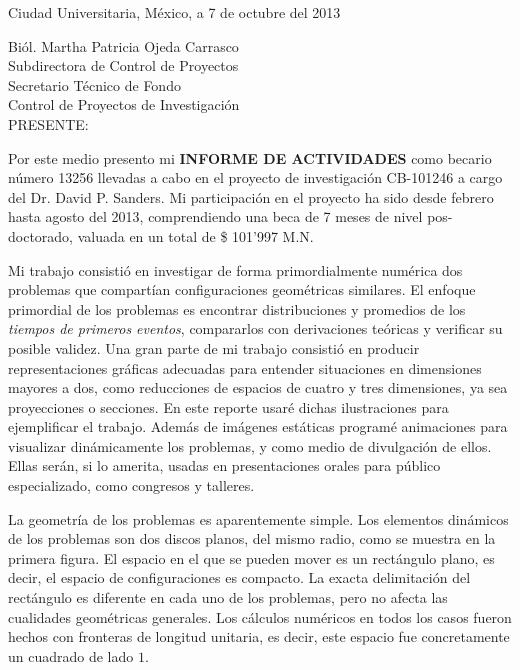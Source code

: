 \documentclass[letterpaper, 11pt]{article}
\author{Wilhelm Pablo Karel Zapfe Zaldivar}
\begin{document}
\begin{flushright}
Ciudad Universitaria, México, a 7 de octubre del 2013
\end{flushright}
 
\vspace{4cm}

\noindent Biól. Martha Patricia Ojeda Carrasco
 \\ Subdirectora de Control de Proyectos
\\ Secretario Técnico de Fondo \\ 
Control de Proyectos de Investigación\\
PRESENTE:

\vspace{2cm}

Por este medio presento mi \textbf{INFORME DE ACTIVIDADES} como becario 
número 13256 llevadas a cabo en el proyecto de investigación
CB-101246 a cargo del Dr. David P. Sanders. Mi participación en el proyecto
ha sido desde febrero hasta agosto del 2013, 
comprendiendo una beca
de 7 meses de nivel pos-doctorado, valuada en un total de \$ 101'997 M.N.

Mi trabajo consistió en investigar de forma primordialmente
numérica dos problemas
que compartían configuraciones geométricas similares.
El enfoque primordial de los problemas es encontrar distribuciones y
promedios de los \emph{tiempos de primeros eventos},  
compararlos con derivaciones
teóricas y verificar su posible validez. Una gran parte de mi trabajo
consistió en producir representaciones gráficas adecuadas para
entender situaciones en dimensiones mayores a dos, como
reducciones de espacios de cuatro y tres dimensiones, ya
sea proyecciones o secciones. En este reporte 
usaré dichas ilustraciones para ejemplificar el
trabajo. Además de imágenes estáticas programé 
animaciones para visualizar dinámicamente los problemas, y como
medio de divulgación de ellos. Ellas serán, si lo amerita, usadas
en presentaciones orales 
para público especializado, como congresos y talleres.

La geometría de los problemas es aparentemente simple.
Los elementos dinámicos de los problemas son dos discos
planos, del mismo radio, como se muestra en la primera figura. 
El espacio en el que se pueden mover es un rectángulo plano, es 
decir, el espacio de configuraciones es compacto. La exacta
delimitación del rectángulo es diferente en cada uno de los
problemas, pero no afecta las cualidades geométricas generales.
Los cálculos numéricos en todos los casos fueron hechos con
fronteras de longitud unitaria, es decir, este espacio fue 
concretamente un cuadrado de lado $1$. 
\end{document}
